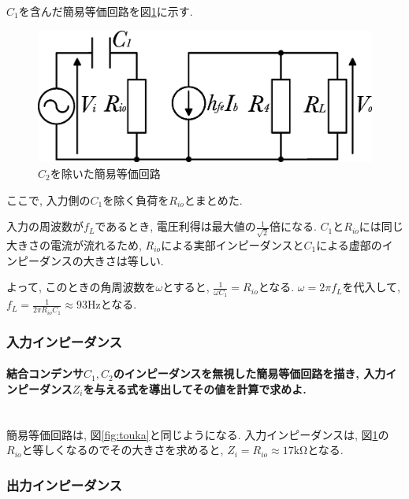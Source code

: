 \documentclass[titlepage]{jsarticle}
\begin{document}
                $C_1$を含んだ簡易等価回路を図\ref{fig:touka1}に示す.

                \begin{figure}[h]
                    \centering
                    \includegraphics[width=0.7\hsize]{images/touka1.eps}
                    \caption{$C_2$を除いた簡易等価回路}
                    \label{fig:touka1}
                \end{figure}

                ここで, 入力側の$C_1$を除く負荷を$R_{io}$とまとめた.

                入力の周波数が$f_L$であるとき, 電圧利得は最大値の$\displaystyle\frac{1}{\sqrt{2}}$倍になる.
                $C_1$と$R_{io}$には同じ大きさの電流が流れるため,
                $R_{io}$による実部インピーダンスと$C_1$による虚部のインピーダンスの大きさは等しい.

                よって, このときの角周波数を$\omega$とすると,
                $\displaystyle\frac{1}{\omega C_1} = R_{io}$となる.
                $\omega = 2 \pi f_L$を代入して,
                $\displaystyle f_L = \frac{1}{2 \pi R_{io} C_1} \approx 93 \mathrm{Hz}$となる.

        \subsubsection{入力インピーダンス} \label{sssec:zi}
            \paragraph{結合コンデンサ$C_1, C_2$のインピーダンスを無視した簡易等価回路を描き, 入力インピーダンス$Z_i$を与える式を導出してその値を計算で求めよ.}
            \mbox{} \\

                簡易等価回路は, 図\ref{fig:touka}と同じようになる.
                入力インピーダンスは, 図\ref{fig:touka1}の$R_{io}$と等しくなるのでその大きさを求めると,
                $Z_i = R_{io} \approx 17 \mathrm{k\Omega}$となる.

        \subsubsection{出力インピーダンス} \label{sssec:zo}
\end{document}
